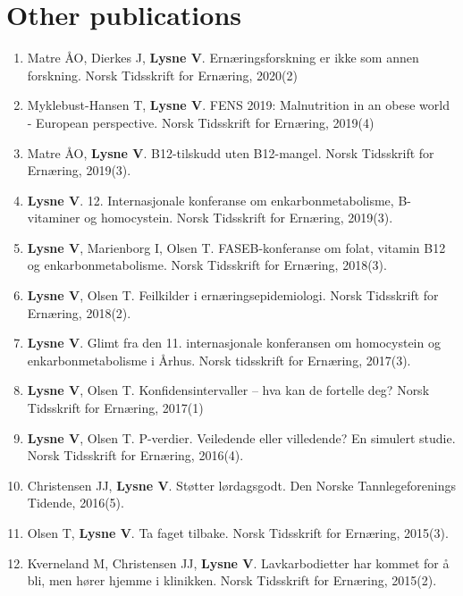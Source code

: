 \documentclass[11pt, a4paper]{awesome-cv}
\providecommand{\tightlist}{%
	\setlength{\itemsep}{0pt}\setlength{\parskip}{0pt}}
\begin{document}
\hypertarget{other-publications}{%
\section{Other publications}\label{other-publications}}

\begin{enumerate}
\def\labelenumi{\arabic{enumi}.}
\tightlist
\item
  Matre ÅO, Dierkes J, \textbf{Lysne V}. Ernæringsforskning er ikke som annen forskning. Norsk Tidsskrift for Ernæring, 2020(2)
\item
  Myklebust-Hansen T, \textbf{Lysne V}. FENS 2019: Malnutrition in an obese world - European perspective. Norsk Tidsskrift for Ernæring, 2019(4)
\item
  Matre ÅO, \textbf{Lysne V}. B12-tilskudd uten B12-mangel. Norsk Tidsskrift for Ernæring, 2019(3).
\item
  \textbf{Lysne V}. 12. Internasjonale konferanse om enkarbonmetabolisme, B-vitaminer og homocystein. Norsk Tidsskrift for Ernæring, 2019(3).
\item
  \textbf{Lysne V}, Marienborg I, Olsen T. FASEB-konferanse om folat, vitamin B12 og enkarbonmetabolisme. Norsk Tidsskrift for Ernæring, 2018(3).
\item
  \textbf{Lysne V}, Olsen T. Feilkilder i ernæringsepidemiologi. Norsk Tidsskrift for Ernæring, 2018(2).
\item
  \textbf{Lysne V}. Glimt fra den 11. internasjonale konferansen om homocystein og enkarbonmetabolisme i Århus. Norsk tidsskrift for Ernæring, 2017(3).
\item
  \textbf{Lysne V}, Olsen T. Konfidensintervaller -- hva kan de fortelle deg? Norsk Tidsskrift for Ernæring, 2017(1)
\item
  \textbf{Lysne V}, Olsen T. P-verdier. Veiledende eller villedende? En simulert studie. Norsk Tidsskrift for Ernæring, 2016(4).
\item
  Christensen JJ, \textbf{Lysne V}. Støtter lørdagsgodt. Den Norske Tannlegeforenings Tidende, 2016(5).
\item
  Olsen T, \textbf{Lysne V}. Ta faget tilbake. Norsk Tidsskrift for Ernæring, 2015(3).
\item
  Kverneland M, Christensen JJ, \textbf{Lysne V}. Lavkarbodietter har kommet for å bli, men hører hjemme i klinikken. Norsk Tidsskrift for Ernæring, 2015(2).
\end{enumerate}

\newpage
\end{document}
